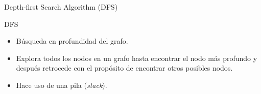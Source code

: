 \documentclass[10pt,spanish,xcolor={svgnames}]{beamer}
\begin{document}
\begin{frame}{Depth-first Search Algorithm (DFS)}
\vspace*{-2em}
\begin{alertblock}{\LARGE DFS}
\begin{itemize}
\item Búsqueda en profundidad del grafo.
\item Explora todos los nodos en un grafo hasta encontrar el nodo más profundo y después retrocede  con el propósito de encontrar otros posibles nodos.
\item Hace uso de una pila (\textit{stack}).
\end{itemize}
\end{alertblock}
\end{frame}
\end{document}

